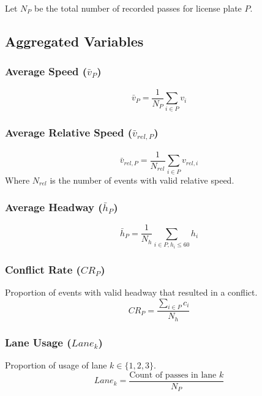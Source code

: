 Let $N_P$ be the total number of recorded passes for license plate $P$.

\subsection{Aggregated Variables}

\subsubsection{Average Speed ($\bar{v}_P$)}
\begin{equation}
    \bar{v}_P = \frac{1}{N_P} \sum_{i \in P} v_i
\end{equation}

\subsubsection{Average Relative Speed ($\bar{v}_{rel, P}$)}
\begin{equation}
    \bar{v}_{rel, P} = \frac{1}{N_{rel}} \sum_{i \in P} v_{rel, i}
\end{equation}
Where $N_{rel}$ is the number of events with valid relative speed.

\subsubsection{Average Headway ($\bar{h}_P$)}
\begin{equation}
    \bar{h}_P = \frac{1}{N_{h}} \sum_{i \in P, h_i \le 60} h_i
\end{equation}

\subsubsection{Conflict Rate ($CR_P$)}
Proportion of events with valid headway that resulted in a conflict.
\begin{equation}
    CR_P = \frac{\sum_{i \in P} c_i}{N_{h}}
\end{equation}

\subsubsection{Lane Usage ($Lane_k$)}
Proportion of usage of lane $k \in \{1, 2, 3\}$.
\begin{equation}
    Lane_k = \frac{\text{Count of passes in lane } k}{N_P}
\end{equation}

